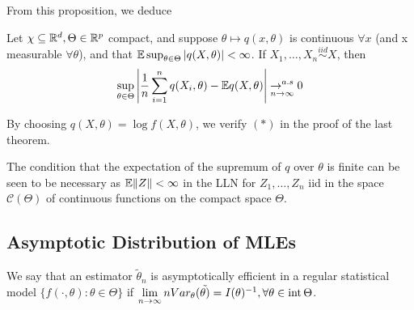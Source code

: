 \documentclass[a4paper]{article}
\begin{document}
From this proposition, we deduce

\begin{prop}
	Let $\chi \subseteq \mathbb{R}^{d}, \Theta \in \mathbb{R}^{p}$ compact, and suppose $\theta \mapsto q(x, \theta)$ is continuous  $\forall x$ (and x measurable $\forall \theta$), and that  $\mathbb{E} \sup_{\theta \in \Theta} |q(X, \theta)| < \infty$. If $X_1, \ldots, X_n \stackrel{iid}{\sim} X$, then
	\[
		\sup_{\theta \in \Theta} \left| \frac{1}{n} \sum_{i=1}^{n} q(X_i, \theta) - \mathbb{E} q(X, \theta) \right| \underset{n \to  \infty}{\to ^{a.s}} 0
	\]
\end{prop}

\begin{remark}
	By choosing $q(X, \theta) = \log f(X,\theta)$, we verify $(\ast)$ in the proof of the last theorem.
	
\end{remark}

\begin{remark}
	The condition that the expectation of the supremum of $q$ over $\theta$ is finite can be seen to be necessary as $\mathbb{E} \|Z\|< \infty$ in the LLN for $Z_1, \ldots, Z_n$ iid in the space $\mathcal{C}(\Theta)$ of continuous functions on the compact space $\Theta$.
\end{remark}

\subsection{Asymptotic Distribution of MLEs}

\begin{defn}
	We say that an estimator $\tilde{\theta}_n$ is asymptotically efficient in a regular statistical model $\{f\left( \cdot , \theta \right) : \theta \in \Theta \}$ if $\lim_{n\to \infty} n Var_{\theta} (\tilde{\theta)} = I(\theta)^{-1}, \forall \theta \in\intr\Theta$.
\end{defn}

\newpage
\end{document}
